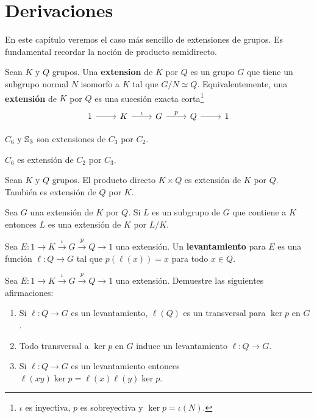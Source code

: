 \chapter{Derivaciones}
\label{derivaciones}

En este capítulo veremos el caso más sencillo de extensiones de grupos. Es fundamental 
recordar la noción de producto semidirecto. 

\begin{definition}
	Sean $K$ y $Q$ grupos. Una \textbf{extension} de $K$ por $Q$ es un grupo
	$G$ que tiene un subgrupo normal $N$ isomorfo a $K$ tal que $G/N\simeq Q$.
	Equivalentemente, una \textbf{extensión} de $K$ por $Q$ es una sucesión
	exacta corta\footnote{$\iota$ es inyectiva, $p$ es sobreyectiva y $\ker
	p=\iota(N)$.}
\[
\begin{tikzcd}
	1 & K & G & Q & 1
	\arrow[from=1-1, to=1-2]
	\arrow["\iota", from=1-2, to=1-3]
	\arrow["p", from=1-3, to=1-4]
	\arrow[from=1-4, to=1-5]
\end{tikzcd}
\]
\end{definition}

\begin{example}
	$C_6$ y $\mathbb{S}_3$ son extensiones de $C_3$ por $C_2$.
\end{example}

\begin{example}
	$C_6$ es extensión de $C_2$ por $C_3$.
\end{example}

\begin{example}
	Sean $K$ y $Q$ grupos. El producto directo $K\times Q$ es extensión de $K$
	por $Q$. También es extensión de $Q$ por $K$.
\end{example}

Sea $G$ una extensión de $K$ por $Q$. Si $L$ es un subgrupo de $G$ que
contiene a $K$ entonces $L$ es una extensión de $K$ por $L/K$. 

\begin{definition}
	Sea $E\colon 1\to K\xrightarrow{\iota}G\xrightarrow{p} Q\to1$ una
	extensión.  Un \textbf{levantamiento} para $E$ es una función $\ell\colon
	Q\to G$ tal que $p(\ell(x))=x$ para todo $x\in Q$. 
\end{definition}

\begin{exercise}
	\label{xca:lifting}
	Sea $E\colon 1\to K\xrightarrow{\iota}G\xrightarrow{p} Q\to1$ una
	extensión.  Demuestre las siguientes afirmaciones:
	\begin{enumerate}
		\item Si $\ell\colon Q\to G$ es un levantamiento, $\ell(Q)$
			es un transversal para $\ker p$ en $G$.
		\item Todo transversal a $\ker p$ en $G$ induce un levantamiento $\ell\colon
			Q\to G$.
		\item Si $\ell\colon Q\to G$ es un levantamiento entonces
			$\ell(xy)\ker p=\ell(x)\ell(y)\ker p$.
	\end{enumerate}
\end{exercise}


